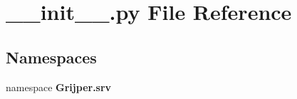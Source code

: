 \section{\-\_\-\-\_\-init\-\_\-\-\_\-.\-py File Reference}
\label{srv_2____init_____8py}
\subsection*{Namespaces}
\begin{DoxyCompactItemize}
\item 
namespace {\bf Grijper.\-srv}
\end{DoxyCompactItemize}
